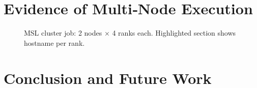 \section{Evidence of Multi‑Node Execution}

\begin{figure}[h]
\centering
\caption{MSL cluster job: 2 nodes × 4 ranks each. Highlighted section shows hostname per rank.}
\label{fig:msl}
\end{figure}

\section{Conclusion and Future Work}
